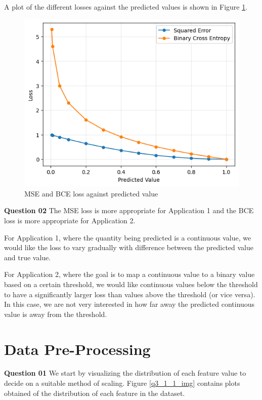 \documentclass{article}[a4paper]
\begin{document}
	A plot of the different losses against the predicted values is shown in Figure \ref{q2_1_img}.

	\begin{figure}[H]
		\centering
		\includegraphics[width=0.9\linewidth]{images/q2_1.png}
		\caption{MSE and BCE loss against predicted value}
		\label{q2_1_img}
	\end{figure}

	\textbf{Question 02} The MSE loss is more appropriate for Application 1 and the BCE loss is more appropriate for Application 2.
	\newline

	For Application 1, where the quantity being predicted is a continuous value, we would like the loss to vary gradually with 
	difference between the predicted value and true value.
	\newline
	
	For Application 2, where the goal is to map a continuous value to a binary value based on a certain threshold, we would like
	continuous values below the threshold to have a significantly larger loss than values above the threshold (or vice versa). In this
	case, we are not very interested in how far away the predicted continuous value is away from the threshold.

	\section{Data Pre-Processing}

	\textbf{Question 01} We start by visualizing the distribution of each feature value to decide on a suitable method of scaling. Figure
	\ref{q3_1_1_img} contains plots obtained of the distribution of each feature in the dataset.
\end{document}
